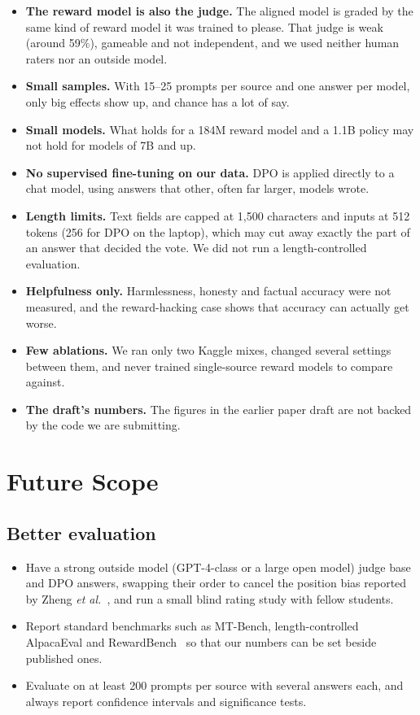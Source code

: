 \begin{itemize}
  \item \textbf{The reward model is also the judge.} The aligned model is graded by the same kind of reward model it was trained to please. That judge is weak (around 59\%), gameable and not independent, and we used neither human raters nor an outside model.
  \item \textbf{Small samples.} With 15--25 prompts per source and one answer per model, only big effects show up, and chance has a lot of say.
  \item \textbf{Small models.} What holds for a 184M reward model and a 1.1B policy may not hold for models of 7B and up.
  \item \textbf{No supervised fine-tuning on our data.} DPO is applied directly to a chat model, using answers that other, often far larger, models wrote.
  \item \textbf{Length limits.} Text fields are capped at 1,500 characters and inputs at 512 tokens (256 for DPO on the laptop), which may cut away exactly the part of an answer that decided the vote. We did not run a length-controlled evaluation.
  \item \textbf{Helpfulness only.} Harmlessness, honesty and factual accuracy were not measured, and the reward-hacking case shows that accuracy can actually get worse.
  \item \textbf{Few ablations.} We ran only two Kaggle mixes, changed several settings between them, and never trained single-source reward models to compare against.
  \item \textbf{The draft's numbers.} The figures in the earlier paper draft are not backed by the code we are submitting.
\end{itemize}

\section{Future Scope}
\label{sec:future}

\subsection{Better evaluation}
\begin{itemize}
  \item Have a strong outside model (GPT-4-class or a large open model) judge base and DPO answers, swapping their order to cancel the position bias reported by Zheng \emph{et al.}~\cite{zheng2023judging}, and run a small blind rating study with fellow students.
  \item Report standard benchmarks such as MT-Bench, length-controlled AlpacaEval and RewardBench~\cite{lambert2024rewardbench} so that our numbers can be set beside published ones.
  \item Evaluate on at least 200 prompts per source with several answers each, and always report confidence intervals and significance tests.
\end{itemize}

